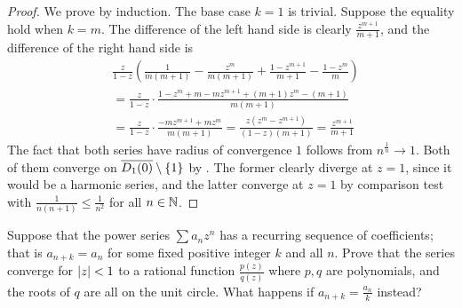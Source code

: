 \documentclass{report}
\begin{document}
\begin{proof}
We prove by induction. The base case $k=1$ is trivial. Suppose the equality hold when  $k=m$. The difference of the left hand side is clearly  $\frac{z^{m+1}}{m+1}$, and the difference of the right hand side is 
\begin{align*}
&\frac{z}{1-z}(\frac{1}{m(m+1)}-\frac{z^m}{m(m+1)}+ \frac{1-z^{m+1}}{m+1}- \frac{1-z^m}{m})\\
&= \frac{z}{1-z} \cdot \frac{1-z^m + m- mz^{m+1}+(m+1)z^m-(m+1)}{m(m+1)} \\
&=\frac{z}{1-z}\cdot \frac{-mz^{m+1}+mz^{m}}{m(m+1)}= \frac{z(z^m-z^{m+1})}{(1-z )(m+1)}=\frac{z^{m+1}}{m+1}
\end{align*}
The fact that both series have radius of convergence $1$ follows from  $n^{\frac{1}{n}}\to 1$. Both of them converge on $\overline{D_1(0)}\setminus \{ 1 \}$ by . The former clearly diverge at $z=1$, since it would be a harmonic series, and the latter converge at $z=1$ by comparison test with  $\frac{1}{n(n+1)}\leq \frac{1}{n^2}$ for all $n\in\mathbb{N}$. 
\end{proof}
\begin{question}{}{}
Suppose that the power series $\sum a_nz^n$ has a recurring sequence of coefficients; that is $a_{n+k}=a_n$ for some fixed positive integer $k$ and all $n$. Prove that the series converge for  $\left|z\right|<1$ to a rational function $ \frac{p(z)}{q(z)}$ where $p,q$ are polynomials, and the roots of  $q$ are all on the unit circle. What happens if $a_{n+k}=\frac{a_n}{k}$ instead? 
\end{question}
\end{document}
